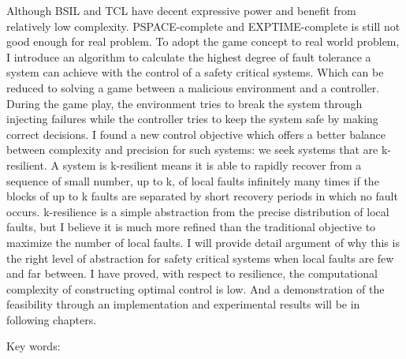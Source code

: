\begin{abstractEN}
Although BSIL and TCL have decent expressive power and benefit from relatively low complexity. PSPACE-complete and EXPTIME-complete is still not good enough for real problem. To adopt the game concept to real world problem, I introduce an algorithm to calculate the highest degree of fault tolerance a system can achieve with the control of a safety critical systems. Which can be reduced to solving a game between a malicious environment and a controller. During the game play, the environment tries to break the system through injecting failures while the controller tries to keep the system safe by making correct decisions. I found a new control objective which offers a better balance between complexity and precision for such systems: we seek systems that are k-resilient. A system is k-resilient means it is able to rapidly recover from a sequence of small number, up to k, of local faults infinitely many times if the blocks of up to k faults are separated by short recovery periods in which no fault occurs. k-resilience is a simple abstraction from the precise distribution of local faults, but I believe it is much more refined than the traditional objective to maximize the number of local faults. I will provide detail argument of why this is the right level of abstraction for safety critical systems when local faults are few and far between. I have proved, with respect to resilience, the computational complexity of constructing optimal control is low. And a demonstration of the feasibility through an implementation and experimental results will be in following chapters.

Key words:

\end{abstractEN}
